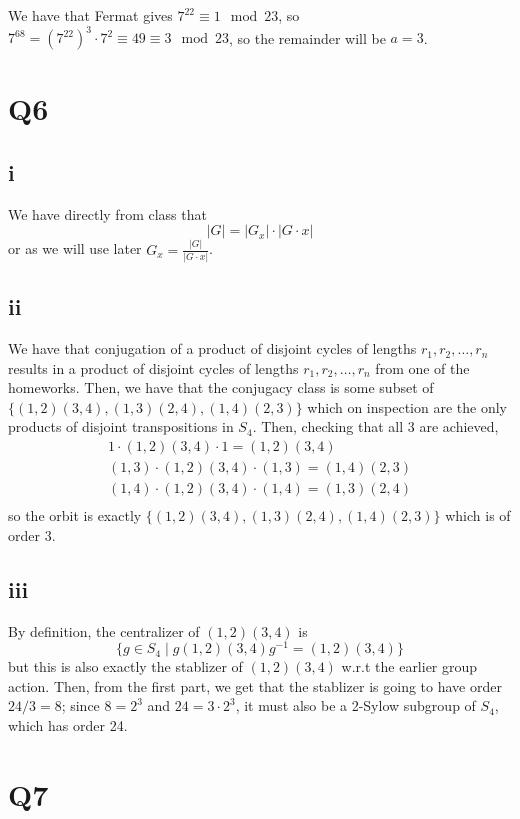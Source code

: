 \documentclass[12pt,letterpaper]{article}
\theoremstyle{definition}
\begin{document}
We have that Fermat gives $7^{22} \equiv 1 \mod 23$, so $7^{68} = (7^{22})^{3} \cdot 7^{2} \equiv 49 \equiv 3 \mod 23$, so the remainder will be $a = 3$.

\section*{Q6}
\subsection*{i}

We have directly from class that
\[
  |G| = |G_{x}| \cdot |G \cdot x|
\]
or as we will use later $G_{x} = \frac{|G|}{|G \cdot x|}$.

\subsection*{ii}

We have that conjugation of a product of disjoint cycles of lengths $r_{1}, r_{2}, \dots, r_{n}$ results in a product of disjoint cycles of lengths $r_{1}, r_{2}, \dots, r_{n}$ from one of the homeworks. Then, we have that the conjugacy class is some subset of $\{(1,2)(3,4), (1,3)(2,4), (1,4)(2,3)\}$ which on inspection are the only products of disjoint transpositions in $S_{4}$. Then, checking that all 3 are achieved,
\begin{align*}
  1 \cdot (1,2)(3,4) \cdot 1 = (1,2)(3,4) \\
  (1,3) \cdot (1,2)(3,4) \cdot (1,3) = (1,4)(2,3) \\
  (1,4) \cdot (1,2)(3,4) \cdot (1,4) = (1,3)(2,4) \\
\end{align*}
so the orbit is exactly $\{(1,2)(3,4), (1,3)(2,4), (1,4)(2,3)\}$ which is of order $3$.

\subsection*{iii}

By definition, the centralizer of $(1,2)(3,4)$ is
\[
  \{g \in S_{4} \mid g(1,2)(3,4)g^{-1} = (1,2)(3,4)\}
\]
but this is also exactly the stablizer of $(1,2)(3,4)$ w.r.t the earlier group action. Then, from the first part, we get that the stablizer is going to have order $24/3 = 8$; since $8 = 2^{3}$ and $24 = 3 \cdot 2^{3}$, it must also be a 2-Sylow subgroup of $S_{4}$, which has order 24.

\section*{Q7}
\end{document}
